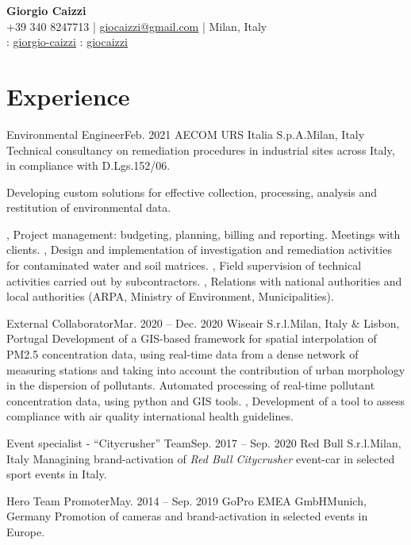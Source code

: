 \documentclass[letterpaper,11pt]{article}
\begin{document}
\begin{center}
  \textbf{\Huge \bfseries Giorgio Caizzi} \\
  \vspace{3pt}
  \small +39 340 8247713 | \href{mailto:giocaizzi@gmail.com}{\underline{giocaizzi@gmail.com}}
  | Milan, Italy\\
  \vspace{3pt}
  \faLinkedinSquare{} : \href{https://linkedin.com/in/giorgio-caizzi/}{\underline{giorgio-caizzi}}
  \faGithubSquare{} : \href{https://www.github.com/giocaizzi/}{\underline{giocaizzi}}\\
\end{center}
\vspace{-30pt}

\section{Experience}
\begin{sectionElementsList}
  \experienceElement
  {Environmental Engineer}{Feb. 2021}
  {AECOM URS Italia S.p.A.}{Milan, Italy}
  {
    Technical consultancy on remediation procedures in industrial sites across Italy, in compliance with D.Lgs.152/06.
  }{

    {
        Developing custom solutions for effective collection, processing, analysis and restitution of environmental data.

      },
    {
        Project management: budgeting, planning, billing and reporting. Meetings with clients.
      },
    {
        Design and implementation of investigation and remediation activities for contaminated water and soil matrices.
      },
    {
        Field supervision of technical activities carried out by subcontractors.
      },
    {
        Relations with national authorities and local authorities  (ARPA, Ministry of Environment, Municipalities).
      }
  }
  \experienceElement
  {External Collaborator}{Mar. 2020 -- Dec. 2020}
  {Wiseair S.r.l.}{Milan, Italy \& Lisbon, Portugal}
  {
    Development of a GIS-based framework for spatial interpolation of PM2.5 concentration
    data, using real-time data from a dense network of measuring stations and taking into account the contribution of
    urban morphology in the dispersion of pollutants.
  }
  {
    {
        Automated processing of real-time pollutant concentration data, using python and GIS tools.
      },
    {
        Development of a tool to assess compliance with air quality international health guidelines.
      }
  }

  \experienceElement
  {Event specialist - “Citycrusher” Team}{Sep. 2017 -- Sep. 2020}
  {Red Bull S.r.l.}{Milan, Italy}
  {Managining brand-activation of \textit{Red Bull Citycrusher} event-car in selected sport
    events in Italy.}
  {}

  \experienceElement
  {Hero Team Promoter}{May. 2014 -- Sep. 2019}
  {GoPro EMEA GmbH}{Munich, Germany}
  {Promotion of cameras and brand-activation in selected events in Europe.}
  {}
\end{sectionElementsList}
\end{document}
